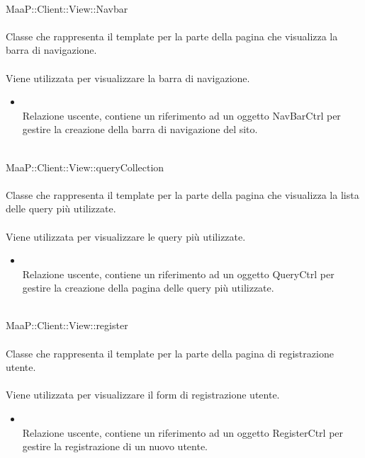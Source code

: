 \\
MaaP::Client::View::Navbar\\
\\
Classe che rappresenta il template per la parte della pagina che visualizza la barra di navigazione.\\
\\
Viene utilizzata per visualizzare la barra di navigazione.\\
\begin{itemize}
\item{}\\
Relazione uscente, contiene un riferimento ad un oggetto NavBarCtrl per gestire la creazione della barra di navigazione del sito.
\end{itemize}

\\
MaaP::Client::View::queryCollection\\
\\
Classe che rappresenta il template per la parte della pagina che visualizza la lista delle query più utilizzate.\\
\\
Viene utilizzata per visualizzare le query più utilizzate.\\
\begin{itemize}
\item{}\\
Relazione uscente, contiene un riferimento ad un oggetto QueryCtrl per gestire la creazione della pagina delle query più utilizzate.
\end{itemize}

\\
MaaP::Client::View::register\\
\\
Classe che rappresenta il template per la parte della pagina di registrazione utente.\\
\\
Viene utilizzata per visualizzare il form di registrazione utente.\\
\begin{itemize}
\item{}\\
Relazione uscente, contiene un riferimento ad un oggetto RegisterCtrl per gestire la registrazione di un nuovo utente.
\end{itemize}

